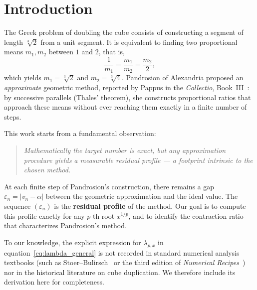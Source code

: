 \documentclass[10pt,a4paper,oneside]{book}
\theoremstyle{definition}
\theoremstyle{remark}
\newcommand{\cbrt}[1]{\sqrt[3]{#1}}
\newcommand{\eps}{\varepsilon}
\begin{document}
\bigskip

\section{Introduction}

The Greek problem of doubling the cube consists of constructing a segment of length $\cbrt{2}$ from a unit segment. It is equivalent to finding two proportional means $m_1, m_2$ between $1$ and $2$, that is,
\[
  \frac{1}{m_1} = \frac{m_1}{m_2} = \frac{m_2}{2},
\]
which yields $m_1 = \cbrt{2}$ and $m_2 = \cbrt{4}$. Pandrosion of Alexandria proposed an \emph{approximate} geometric method, reported by Pappus in the \textit{Collectio}, Book~III~\cite{pappus}: by successive parallels (Thales' theorem), she constructs proportional ratios that approach these means without ever reaching them exactly in a finite number of steps.

\medskip

This work starts from a fundamental observation:

\begin{quote}
\itshape Mathematically the target number is exact, but any approximation procedure yields a measurable residual profile --- a footprint intrinsic to the chosen method.
\end{quote}

At each finite step of Pandrosion's construction, there remains a gap $\eps_n = |v_n - \alpha|$ between the geometric approximation and the ideal value. The sequence $(\eps_n)$ is the \textbf{residual profile} of the method. Our goal is to compute this profile exactly for any $p$-th root $x^{1/p}$, and to identify the contraction ratio that characterizes Pandrosion's method.

\medskip

To our knowledge, the explicit expression for $\lambda_{p,x}$ in equation~\eqref{eq:lambda_general} is not recorded in standard numerical analysis textbooks (such as Stoer--Bulirsch~\cite{stoer} or the third edition of \emph{Numerical Recipes}~\cite{numrecipes}) nor in the historical literature on cube duplication.  We therefore include its derivation here for completeness.

\medskip
\end{document}
